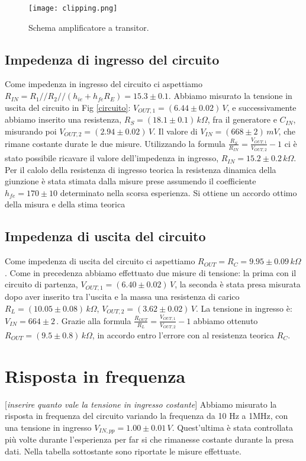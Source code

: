 \documentclass[10pt,a4paper]{article}
\newcommand{\rem}[1]{[\emph{#1}]}
\begin{document}
\begin{figure}[!htb]
  \centering
  \texttt{[image: clipping.png]}
\caption{Schema amplificatore a transitor.}
\label{clipping}
\end{figure}

\subsection{Impedenza di ingresso del circuito}
Come impedenza in ingresso del circuito ci aspettiamo $R_{IN}=R_1//R_2//(h_{ie}+h_{fe}R_E) = 15.3\pm0.1$.
Abbiamo misurato la tensione in uscita del circuito in Fig \ref{circuito}: $V_{OUT,1} = (6.44\pm0.02) \, V$, e successivamente abbiamo inserito una resistenza, $R_S= (18.1\pm0.1) \, k\Omega$, fra il generatore e $C_{IN}$, misurando poi $V_{OUT,2}= (2.94 \pm 0.02) \, V$. Il valore di $V_{IN} = (668 \pm 2) \, mV$, che rimane costante durate le due misure. Utilizzando la formula $\frac{R_S}{R_{IN}}=\frac{V_{OUT,1}}{V_{OUT,2}}-1$ ci è stato possibile ricavare il valore dell'impedenza in ingresso, $R_{IN}= 15.2\pm0.2\, k\Omega$. 
Per il calolo della resistenza di ingresso teorica la resistenza dinamica della giunzione è stata stimata dalla misure prese assumendo il coefficiente $h_{fe} = 170\pm10$ determinato nella scorsa esperienza. Si ottiene un accordo ottimo della misura e della stima teorica

\subsection{Impedenza di uscita del circuito}
Come impedenza di uscita del circuito ci aspettiamo $R_{OUT}= R_C = 9.95\pm0.09\, k\Omega$. Come in precedenza abbiamo effettuato due misure di tensione: la prima con il circuito di partenza, $V_{OUT,1}= (6.40\pm0.02) \, V$, la seconda è stata presa misurata dopo aver inserito tra l'uscita e la massa una resistenza di carico $R_L = (10.05 \pm 0.08) \, k\Omega$, $V_{OUT,2}= (3.62\pm0.02)\,V$. La tensione in ingresso è: $V_{IN} = 664 \pm 2 \,$. Grazie alla formula $\frac{R_{OUT}}{R_{L}}=\frac{V_{OUT,1}}{V_{OUT,2}}-1$ abbiamo ottenuto $R_{OUT}= (9.5\pm0.8)\, k\Omega$, in accordo entro l'errore con al resistenza teorica $R_C$.


\section{Risposta in frequenza}
\rem{inserire quanto vale la tensione in ingresso costante}
Abbiamo misurato la risposta in frequenza del circuito variando la frequenza da 10 Hz a 1MHz, con una tensione in ingresso $V_{IN,pp}= 1.00 \pm 0.01\, V$. Quest'ultima è stata controllata più volte durante l'esperienza per far si che rimanesse costante durante la presa dati. Nella tabella sottostante sono riportate le misure effettuate.
\end{document}
